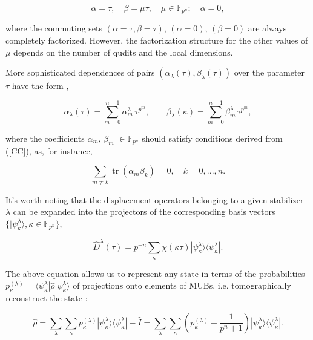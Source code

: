\documentclass[quantumrep,article,submit,pdftex,moreauthors]{Definitions/mdpi}
\DeclareMathOperator{\tr}{tr}
\begin{document}
\begin{equation}
  \alpha = \tau, \quad \beta = \mu \tau, \quad \mu \in \mathbb{F}_{p^{n}};
  \quad \alpha = 0,
  \label{rays}
\end{equation}

where the commuting sets $\left(\alpha = \tau, \beta = \tau \right)$,
$\left(\alpha = 0\right)$, $\left(\beta = 0\right)$ are always completely
factorized.  However, the factorization structure for the other values of $\mu$
depends on the number of qudits and the local dimensions.

More sophisticated dependences of pairs
$\left(\alpha_{\lambda}(\tau),\beta_{\lambda }(\tau)\right)$ over the parameter
$\tau$ have the form \cite{GS2,JPA09},

\begin{equation}
  \alpha_{\lambda }(\tau)
  = \sum_{m=0}^{n-1} \alpha_{m}^{\lambda } \, \tau^{p^{m}},
  \qquad \beta_{\lambda}(\kappa)
  = \sum_{m=0}^{n-1}\beta_{m}^{\lambda} \, \tau^{p^{m}},
  \label{curve1}
\end{equation}

where the coefficients $\alpha_{m}$, $\beta_{m}$ $\in \mathbb{F}_{p^{n}}$
should satisfy conditions derived from (\ref{CC}), as, for instance,

\begin{equation*}
  \sum_{m \neq k} \tr(\alpha_{m}\beta_{k}) = 0, \quad k = 0,...,n.
\end{equation*}

It's worth noting that the displacement operators belonging to a given
stabilizer $\lambda$ can be expanded into the projectors of the corresponding
basis vectors $\{|\psi_{\kappa}^{\lambda}\rangle,\kappa \in
\mathbb{F}_{p^{n}}\}$,

\begin{equation}
  \hat{D}^{\lambda }(\tau )
  = p^{-n} \sum_{\kappa }\chi(\kappa\tau)
  |\psi_{\kappa }^{\lambda }\rangle \langle \psi_{\kappa }^{\lambda }|.
  \label{Dexp}
\end{equation}

The above equation allows us to represent any state in terms of the
probabilities $p_{\kappa}^{(\lambda)} = \langle
\psi_{\kappa}^{\lambda}|\hat{\rho}|\psi_{\kappa}^{\lambda}\rangle$ of
projections onto elements of MUBs, i.e. tomographically reconstruct the state
\cite{gibbons,galvao,cormick,ivanovic,DFW11,DFW12,Durt2006}:

\begin{equation}
  \hat{\rho}
  = \sum_{\lambda}\sum_{\kappa}
  p_{\kappa}^{(\lambda)} |\psi_{\kappa}^{\lambda}\rangle
  \langle \psi_{\kappa}^{\lambda}| - \hat{I}
  = \sum_{\lambda }\sum_{\kappa}\left(
    p_{\kappa }^{(\lambda)}-\frac{1}{p^{n}+1}
  \right)
  |\psi_{\kappa}^{\lambda }\rangle \langle \psi_{\kappa}^{\lambda}|.
  \label{tom r}
\end{equation}
\end{document}
